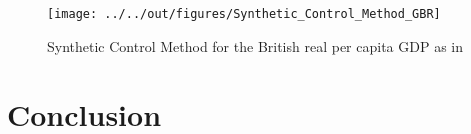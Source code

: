 \documentclass[11pt, a4paper, leqno]{article}
\begin{document}
\begin{figure} [h]
    \caption{Synthetic Control Method for the British real per capita GDP as in \citet{Born2018}}
    
    \texttt{[image: ../../out/figures/Synthetic\_Control\_Method\_GBR]}

\end{figure}


\section{Conclusion}


\newpage






\end{document}
